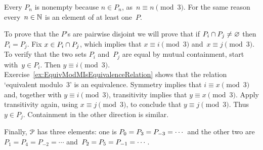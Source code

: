 \documentclass{ibl}  %
\begin{document}
\begin{problem}
\begin{exes}
\begin{answer}
  Every $P_n$ is nonempty because $n\in P_n$, as~$n\equiv n\pmod 3$.
  For the same reason every~$n\in\mathbb{N}$ is an element of at least
  one~$P$.

  To prove that the $P$'s are pairwise disjoint
  we will prove that if 
  $P_i\cap P_j\neq \varnothing$ then $P_i=P_j$.
  Fix $x\in P_i\cap P_j$, which implies that
  $x\equiv i\pmod 3$ and~$x\equiv j\pmod 3$.
  To verify that the two sets $P_i$ and~$P_j$ are equal by mutual
  containment, start with~$y\in P_i$.
  Then $y\equiv i\pmod 3$.
  Exercise~\ref{ex:EquivModMIsEquivalenceRelation}
  shows that the relation `equivalent modulo~$3$' is an 
  equivalence.
  Symmetry implies that $i\equiv x\pmod 3$ and, 
  together with $y\equiv i\pmod 3$,
  transitivity implies that $y\equiv x\pmod 3$.
  Apply transitivity again, using $x\equiv j\pmod 3$, to conclude that
  $y\equiv j\pmod 3$. 
  Thus~$y\in P_j$.
  Containment in the other direction is similar.  

  Finally, $\EuScript{P}$ has three elements: 
  one is $P_0=P_3=P_{-3}=\cdots\hbox{}$ and the other two are
  $P_1=P_4=P_{-2}=\cdots{}$ and~$P_2=P_5=P_{-1}=\cdots\hbox{}$.  
\end{answer}
\end{exes}
\end{problem}
\end{document}
